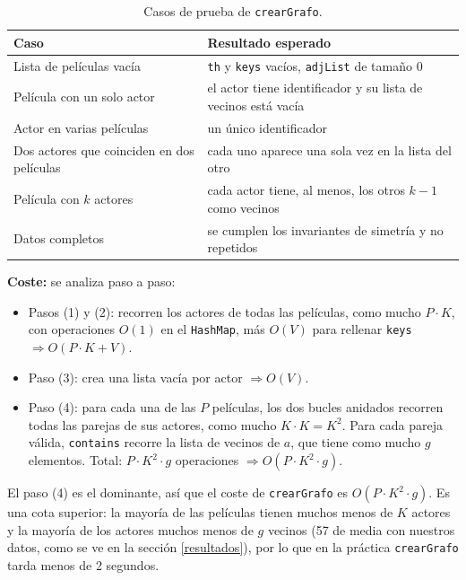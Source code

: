 \documentclass[a4paper,11pt]{report}
\newcommand{\coste}[1]{\par\noindent\textbf{Coste:} #1\par}
\begin{document}
\begin{table}[ht]
\centering
\begin{tabular}{p{5.2cm} p{8cm}}
\toprule
Caso & Resultado esperado \\
\midrule
Lista de películas vacía & \texttt{th} y \texttt{keys} vacíos, \texttt{adjList} de tamaño 0 \\
Película con un solo actor & el actor tiene identificador y su lista de vecinos está vacía \\
Actor en varias películas & un único identificador \\
Dos actores que coinciden en dos películas & cada uno aparece una sola vez en la lista del otro \\
Película con $k$ actores & cada actor tiene, al menos, los otros $k-1$ como vecinos \\
Datos completos & se cumplen los invariantes de simetría y no repetidos \\
\bottomrule
\end{tabular}
\caption{Casos de prueba de \texttt{crearGrafo}.}
\end{table}

\coste{se analiza paso a paso:
\begin{itemize}
    \item Pasos (1) y (2): recorren los actores de todas las películas, como mucho $P \cdot K$, con operaciones $O(1)$ en el \texttt{HashMap}, más $O(V)$ para rellenar \texttt{keys} $\Rightarrow O(P \cdot K + V)$.
    \item Paso (3): crea una lista vacía por actor $\Rightarrow O(V)$.
    \item Paso (4): para cada una de las $P$ películas, los dos bucles anidados recorren todas las parejas de sus actores, como mucho $K \cdot K = K^2$. Para cada pareja válida, \texttt{contains} recorre la lista de vecinos de $a$, que tiene como mucho $g$ elementos. Total: $P \cdot K^2 \cdot g$ operaciones $\Rightarrow O(P \cdot K^2 \cdot g)$.
\end{itemize}
El paso (4) es el dominante, así que el coste de \texttt{crearGrafo} es $O(P \cdot K^2 \cdot g)$. Es una cota superior: la mayoría de las películas tienen muchos menos de $K$ actores y la mayoría de los actores muchos menos de $g$ vecinos (57 de media con nuestros datos, como se ve en la sección \ref{resultados}), por lo que en la práctica \texttt{crearGrafo} tarda menos de 2 segundos.}

\end{document}
